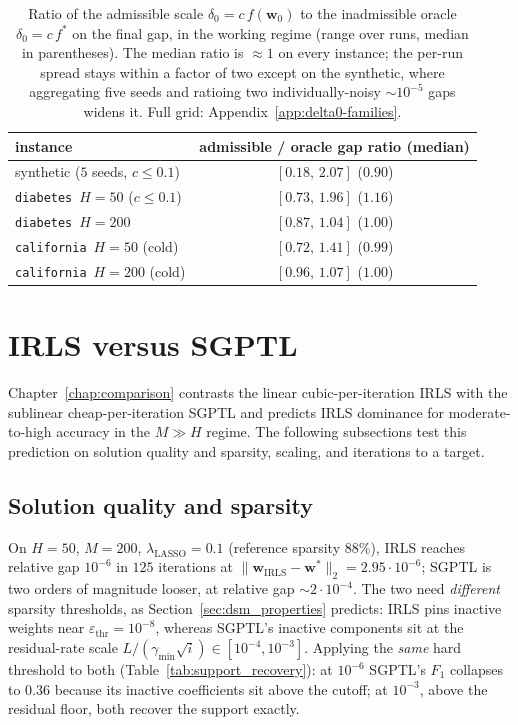 \begin{table}[H]
    \centering
    \small
    \setlength{\tabcolsep}{8pt}
    \begin{tabular}{lc}
        \toprule
        instance & admissible / oracle gap ratio (median) \\
        \midrule
        synthetic ($5$ seeds, $c\le 0.1$)   & $[0.18,\,2.07]$ ($0.90$) \\
        \texttt{diabetes}~$H=50$ ($c\le 0.1$) & $[0.73,\,1.96]$ ($1.16$) \\
        \texttt{diabetes}~$H=200$              & $[0.87,\,1.04]$ ($1.00$) \\
        \texttt{california}~$H=50$ (cold)      & $[0.72,\,1.41]$ ($0.99$) \\
        \texttt{california}~$H=200$ (cold)     & $[0.96,\,1.07]$ ($1.00$) \\
        \bottomrule
    \end{tabular}
    \caption{Ratio of the admissible scale $\delta_{0}=c\,f(\mathbf{w}_{0})$
    to the inadmissible oracle $\delta_{0}=c\,f^{*}$ on the final gap, in the
    working regime (range over runs, median in parentheses). The median ratio
    is $\approx 1$ on every instance; the per-run spread stays within a factor
    of two except on the synthetic, where aggregating five seeds and ratioing
    two individually-noisy $\sim\!10^{-5}$ gaps widens it. Full grid:
    Appendix~\ref{app:delta0-families}.}
    \label{tab:delta0-ratio}
\end{table}

\section{IRLS versus SGPTL}
\label{sec:comparison_results}
Chapter~\ref{chap:comparison} contrasts the linear cubic-per-iteration
IRLS with the sublinear cheap-per-iteration SGPTL and predicts IRLS
dominance for moderate-to-high accuracy in the $M\gg H$ regime. The
following subsections test this prediction on solution quality and
sparsity, scaling, and iterations to a target.

\subsection{Solution quality and sparsity}
\label{sec:quality}
On $H=50$, $M=200$, $\lambda_\text{LASSO}=0.1$ (reference sparsity
$88\%$), IRLS reaches relative gap $10^{-6}$ in $125$ iterations at
$\|\mathbf{w}_\text{IRLS}-\mathbf{w}^{*}\|_{2}=2.95\cdot 10^{-6}$; SGPTL
is two orders of magnitude looser, at relative gap $\sim\!2\cdot 10^{-4}$.
The two need
\emph{different} sparsity thresholds, as Section~\ref{sec:dsm_properties}
predicts: IRLS pins inactive weights near $\varepsilon_\text{thr}=10^{-8}$,
whereas SGPTL's inactive components sit at the residual-rate scale
$L/(\gamma_{\min}\sqrt{i})\in[10^{-4},10^{-3}]$. Applying the
\emph{same} hard threshold to both (Table~\ref{tab:support_recovery}):
at $10^{-6}$ SGPTL's $F_{1}$ collapses to $0.36$ because its inactive
coefficients sit above the cutoff; at $10^{-3}$, above the residual
floor, both recover the support exactly.

